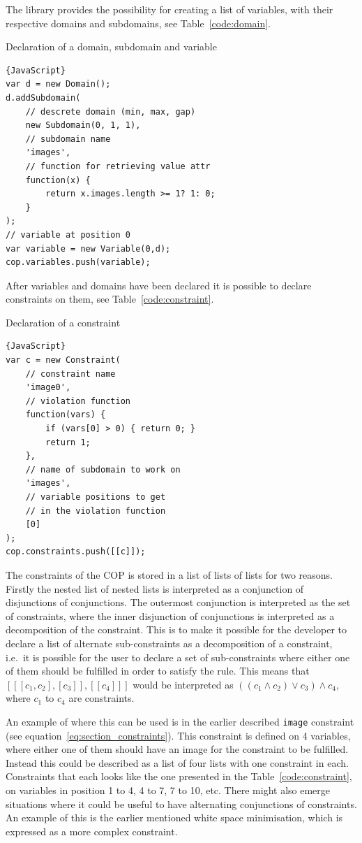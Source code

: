 The library provides the possibility for creating a list of variables, with their respective domains and subdomains, see Table~\ref{code:domain}.
\begin{table}[h!tp]
\caption{Declaration of a domain, subdomain and variable}\label{code:domain}
\begin{lstlisting}{JavaScript}
var d = new Domain();
d.addSubdomain(
	// descrete domain (min, max, gap)
	new Subdomain(0, 1, 1),
	// subdomain name
	'images',
	// function for retrieving value attr
	function(x) {
		return x.images.length >= 1? 1: 0;
	}
);
// variable at position 0
var variable = new Variable(0,d);
cop.variables.push(variable);
\end{lstlisting}
\end{table}

After variables and domains have been declared it is possible to declare constraints on them, see Table~\ref{code:constraint}.
\begin{table}[h!tp]
\caption{Declaration of a constraint}\label{code:constraint}
\begin{lstlisting}{JavaScript}
var c = new Constraint(
	// constraint name
	'image0',
	// violation function
	function(vars) {
		if (vars[0] > 0) { return 0; }
		return 1;
	},
	// name of subdomain to work on
	'images',
	// variable positions to get
	// in the violation function
	[0]
);
cop.constraints.push([[c]]);
\end{lstlisting}
\end{table}

The constraints of the COP is stored in a list of lists of lists for two reasons. Firstly the nested list of nested lists is interpreted as a conjunction of disjunctions of conjunctions. The outermost conjunction is interpreted as the set of constraints, where the inner disjunction of conjunctions is interpreted as a decomposition of the constraint. This is to make it possible for the developer to declare a list of alternate sub-constraints as a decomposition of a constraint, i.e.\ it is possible for the user to declare a set of sub-constraints where either one of them should be fulfilled in order to satisfy the rule. This means that $[[[c_1,c_2],[c_3]],[[c_4]]]$ would be interpreted as $((c_1 \wedge c_2) \vee c_3) \wedge c_4$, where $c_1$ to $c_4$ are constraints.

An example of where this can be used is in the earlier described \texttt{image} constraint (see equation~\vref{eq:section_constraints}). This constraint is defined on 4 variables, where either one of them should have an image for the constraint to be fulfilled. Instead this could be described as a list of four lists with one constraint in each. Constraints that each looks like the one presented in the Table~\ref{code:constraint}, on variables in position 1 to 4, 4 to 7, 7 to 10, etc. There might also emerge situations where it could be useful to have alternating conjunctions of constraints. An example of this is the earlier mentioned white space minimisation, which is expressed as a more complex constraint.

